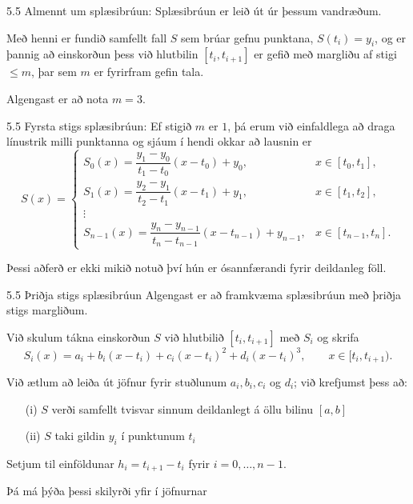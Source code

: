 \begin{frame}{5.5 Almennt um splæsibrúun:} 
Splæsibrúun er leið út úr þessum vandræðum. 

\pause
\smallskip
Með henni er fundið
samfellt fall $S$ sem brúar gefnu punktana, $S(t_i)=y_i$, og er þannig
að einskorðun þess við hlutbilin $[t_i,t_{i+1}]$ er gefið með margliðu
af stigi $\leq m$, þar sem $m$ er fyrirfram gefin tala. 

\pause
\smallskip
Algengast er að nota $m=3$.
\end{frame}

\begin{frame}{5.5 Fyrsta stigs splæsibrúun:} 
Ef stigið $m$ er $1$, þá erum við einfaldlega að draga línustrik milli punktanna og sjáum í hendi okkar að lausnin er
\begin{equation*}
	S(x) = \begin{cases}
		S_0(x) = \dfrac {y_1-y_0}{t_1-t_0}(x-t_0)+y_0, 
			& x \in [t_0,t_1],\\
		S_1(x) = \dfrac {y_2-y_1}{t_2-t_1}(x-t_1)+y_1, 
			& x \in [t_1,t_2],\\
		\vdots & \\
		S_{n-1}(x) = \dfrac {y_n-y_{n-1}}{t_n-t_{n-1}}
			(x-t_{n-1})+y_{n-1}, &x \in [t_{n-1},t_n].
	\end{cases}
\end{equation*}

\pause
\smallskip
Þessi aðferð er ekki mikið notuð því hún er ósannfærandi fyrir
deildanleg föll.
\end{frame}

\begin{frame}{5.5 Þriðja stigs splæsibrúun} 
Algengast er að framkvæma splæsibrúun með þriðja stigs margliðum. 

\pause
\smallskip
Við skulum tákna einskorðun $S$ við hlutbilið $[t_i,t_{i+1}]$ með $S_i$ og
skrifa 
\begin{equation*}
	S_i(x) = a_i+b_i(x-t_i)+c_i(x-t_i)^2+d_i(x-t_i)^3, 
		\qquad x\in [t_i,t_{i+1}).
\end{equation*}

\pause
\smallskip
Við ætlum að leiða út jöfnur fyrir stuðlunum $a_i, b_i, c_i$ og $d_i$;
við krefjumst þess að: 

\begin{enumerate}
\item[(i)] $S$ verði samfellt tvisvar sinnum deildanlegt á
öllu bilinu $[a,b]$
\item[(ii)] $S$ taki gildin $y_i$ í punktunum $t_i$ 
\end{enumerate}

\pause
\smallskip
Setjum til einföldunar $h_i = t_{i+1}-t_i$ fyrir $i = 0,
\ldots, n-1$.

\pause
\smallskip
 Þá má þýða þessi skilyrði yfir í jöfnurnar 
\end{frame}

